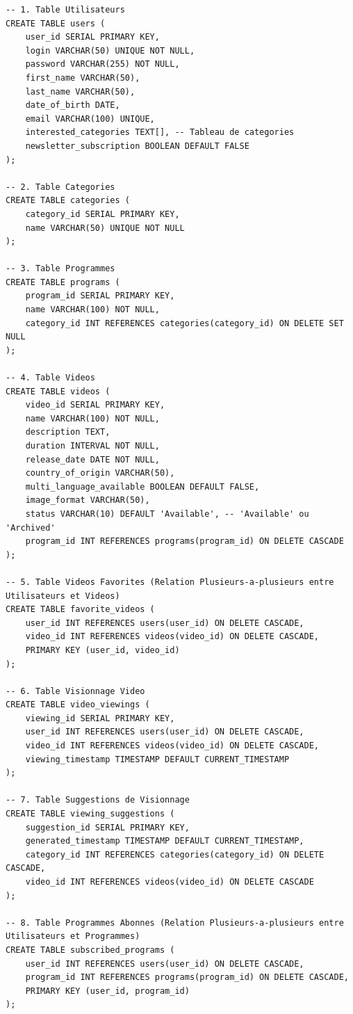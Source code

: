 \documentclass[a4paper,12pt]{article}
\begin{document}
\begin{lstlisting}
-- 1. Table Utilisateurs
CREATE TABLE users (
    user_id SERIAL PRIMARY KEY,
    login VARCHAR(50) UNIQUE NOT NULL,
    password VARCHAR(255) NOT NULL,
    first_name VARCHAR(50),
    last_name VARCHAR(50),
    date_of_birth DATE,
    email VARCHAR(100) UNIQUE,
    interested_categories TEXT[], -- Tableau de categories
    newsletter_subscription BOOLEAN DEFAULT FALSE
);

-- 2. Table Categories
CREATE TABLE categories (
    category_id SERIAL PRIMARY KEY,
    name VARCHAR(50) UNIQUE NOT NULL
);

-- 3. Table Programmes
CREATE TABLE programs (
    program_id SERIAL PRIMARY KEY,
    name VARCHAR(100) NOT NULL,
    category_id INT REFERENCES categories(category_id) ON DELETE SET NULL
);

-- 4. Table Videos
CREATE TABLE videos (
    video_id SERIAL PRIMARY KEY,
    name VARCHAR(100) NOT NULL,
    description TEXT,
    duration INTERVAL NOT NULL,
    release_date DATE NOT NULL,
    country_of_origin VARCHAR(50),
    multi_language_available BOOLEAN DEFAULT FALSE,
    image_format VARCHAR(50),
    status VARCHAR(10) DEFAULT 'Available', -- 'Available' ou 'Archived'
    program_id INT REFERENCES programs(program_id) ON DELETE CASCADE
);

-- 5. Table Videos Favorites (Relation Plusieurs-a-plusieurs entre Utilisateurs et Videos)
CREATE TABLE favorite_videos (
    user_id INT REFERENCES users(user_id) ON DELETE CASCADE,
    video_id INT REFERENCES videos(video_id) ON DELETE CASCADE,
    PRIMARY KEY (user_id, video_id)
);

-- 6. Table Visionnage Video
CREATE TABLE video_viewings (
    viewing_id SERIAL PRIMARY KEY,
    user_id INT REFERENCES users(user_id) ON DELETE CASCADE,
    video_id INT REFERENCES videos(video_id) ON DELETE CASCADE,
    viewing_timestamp TIMESTAMP DEFAULT CURRENT_TIMESTAMP
);

-- 7. Table Suggestions de Visionnage
CREATE TABLE viewing_suggestions (
    suggestion_id SERIAL PRIMARY KEY,
    generated_timestamp TIMESTAMP DEFAULT CURRENT_TIMESTAMP,
    category_id INT REFERENCES categories(category_id) ON DELETE CASCADE,
    video_id INT REFERENCES videos(video_id) ON DELETE CASCADE
);

-- 8. Table Programmes Abonnes (Relation Plusieurs-a-plusieurs entre Utilisateurs et Programmes)
CREATE TABLE subscribed_programs (
    user_id INT REFERENCES users(user_id) ON DELETE CASCADE,
    program_id INT REFERENCES programs(program_id) ON DELETE CASCADE,
    PRIMARY KEY (user_id, program_id)
);
\end{lstlisting}
\end{document}
